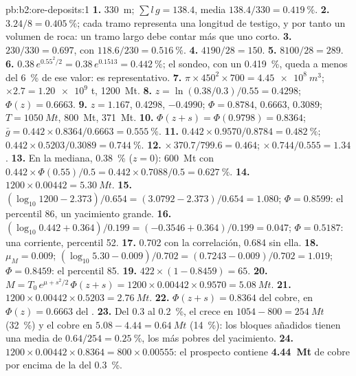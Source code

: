 \begin{solution}{pb:b2:ore-deposits:1}
\textbf{1.} \qty{330}{m}; $\sum l\,g = 138.4$, media $138.4/330 = \qty{0.419}{\percent}$.
\textbf{2.} $3.24/8 = \qty{0.405}{\percent}$; cada tramo representa una longitud de testigo, y por tanto un
volumen de roca: un tramo largo debe contar más que uno corto.
\textbf{3.} $230/330 = 0.697$, con $118.6/230 = \qty{0.516}{\percent}$.
\textbf{4.} $4190/28 = 150$.
\textbf{5.} $8100/28 = 289$.
\textbf{6.} $0.38\,e^{0.55^2/2} = 0.38\,e^{0.1513} = \qty{0.442}{\percent}$; el sondeo, con un
\qty{0.419}{\percent}, queda a menos del \qty{6}{\percent} de ese valor: es representativo.
\textbf{7.} $\pi \times 450^2 \times 700 = \qty{4.45e8}{m^3}$; $\times 2.7 = \num{1.20e9}$ t,
\qty{1200}{Mt}.
\textbf{8.} $z = \ln(0.38/0.3)/0.55 = 0.4298$; $\Phi(z) = 0.6663$.
\textbf{9.} $z = 1.167$, 0.4298, $-0.4990$; $\Phi = 0.8784$, 0.6663, 0.3089; $T = \qty{1050}{Mt}$,
\qty{800}{Mt}, \qty{371}{Mt}.
\textbf{10.} $\Phi(z + s) = \Phi(0.9798) = 0.8364$; $\bar g = 0.442 \times 0.8364/0.6663 =
\qty{0.555}{\percent}$.
\textbf{11.} $0.442 \times 0.9570/0.8784 = \qty{0.482}{\percent}$; $0.442 \times 0.5203/0.3089 =
\qty{0.744}{\percent}$.
\textbf{12.}  $\times\, 370.7/799.6 = 0.464$;  $\times\, 0.744/0.555 = 1.34$.
\textbf{13.} En la mediana, \qty{0.38}{\percent} ($z = 0$): \qty{600}{Mt} con $0.442 \times
\Phi(0.55)/0.5 = 0.442 \times 0.7088/0.5 = \qty{0.627}{\percent}$.
\textbf{14.} $1200 \times 0.00442 = \qty{5.30}{Mt}$.
\textbf{15.} $(\log_{10} 1200 - 2.373)/0.654 = (3.0792 - 2.373)/0.654 = 1.080$; $\Phi = 0.8599$: el
percentil 86, un yacimiento grande.
\textbf{16.} $(\log_{10} 0.442 + 0.364)/0.199 = (-0.3546 + 0.364)/0.199 = 0.047$; $\Phi = 0.5187$: una
 corriente, percentil 52.
\textbf{17.} 0.702 con la correlación, 0.684 sin ella.
\textbf{18.} $\mu_M = 0.009$; $(\log_{10} 5.30 - 0.009)/0.702 = (0.7243 - 0.009)/0.702 = 1.019$; $\Phi =
0.8459$: el percentil 85.
\textbf{19.} $422 \times (1 - 0.8459) = 65$.
\textbf{20.} $M = T_0\,e^{\mu + s^2/2}\,\Phi(z + s) = 1200 \times 0.00442 \times 0.9570 =
\qty{5.08}{Mt}$.
\textbf{21.} $1200 \times 0.00442 \times 0.5203 = \qty{2.76}{Mt}$.
\textbf{22.} $\Phi(z + s) = 0.8364$ del cobre, en $\Phi(z) = 0.6663$ del .
\textbf{23.} Del 0.3 al \qty{0.2}{\percent}, el  crece en $1054 - 800 = \qty{254}{Mt}$
(\qty{32}{\percent}) y el cobre en $5.08 - 4.44 = \qty{0.64}{Mt}$ (\qty{14}{\percent}): los bloques añadidos
tienen una  media de $0.64/254 = \qty{0.25}{\percent}$, los más pobres del yacimiento.
\textbf{24.} $1200 \times 0.00442 \times 0.8364 = 800 \times 0.00555$: el prospecto contiene
\textbf{\qty[text-series-to-math=true]{4.44}{Mt}} de cobre por encima de la  del \qty{0.3}{\percent}.
\end{solution}
